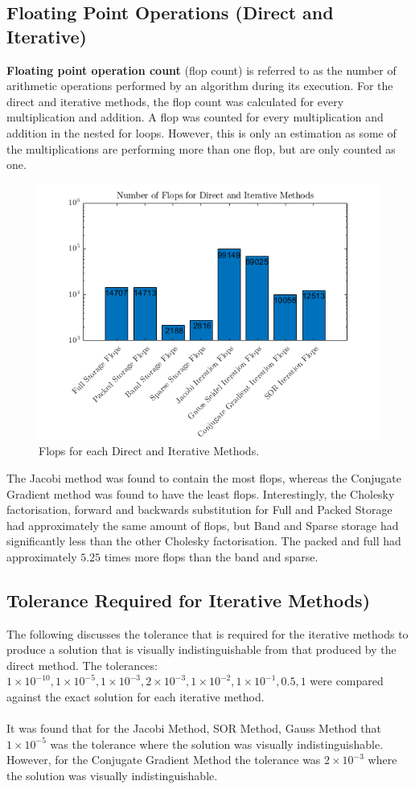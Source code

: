 \documentclass[12pt,a4paper]{article}
\begin{document}
\subsection{Floating Point Operations (Direct and Iterative)}
\textbf{Floating point operation count} (flop count) is referred to as the number of arithmetic operations performed by an algorithm during its execution. For the direct and iterative methods, the flop count was calculated for every multiplication and addition. A flop was counted for every multiplication and addition in the nested for loops. However, this is only an estimation as some of the multiplications are performing more than one flop, but are only counted as one.
\begin{figure}[H]
	\includegraphics[width=\linewidth]{images/FlopsGraph.png}
	\caption{Flops for each Direct and Iterative Methods.}
	\label{fig:flops}
\end{figure}
The Jacobi method was found to contain the most flops, whereas the Conjugate Gradient method was found to have the least flops. Interestingly, the Cholesky factorisation, forward and backwards substitution for Full and Packed Storage had approximately the same amount of flops, but Band and Sparse storage had significantly less than the other Cholesky factorisation. The packed and full had approximately $5.25$ times more flops than the band and sparse.

\subsection{Tolerance Required for Iterative Methods)}
The following discusses the tolerance that is required for the iterative methods to produce a solution that is visually indistinguishable from that produced by the direct method. The tolerances: $1\times10^{-10}, 1\times10^{-5}, 1\times10^{-3}, 2\times10^{-3}, 1\times10^{-2}, 1\times10^{-1}, 0.5, 1$ were compared against the exact solution for each iterative method.
\\\\
It was found that for the Jacobi Method, SOR Method, Gauss Method that $1\times10^{-5}$ was the tolerance where the solution was visually indistinguishable. However, for the Conjugate Gradient Method the tolerance was $2\times10^{-3}$ where the solution was visually indistinguishable.
\end{document}
